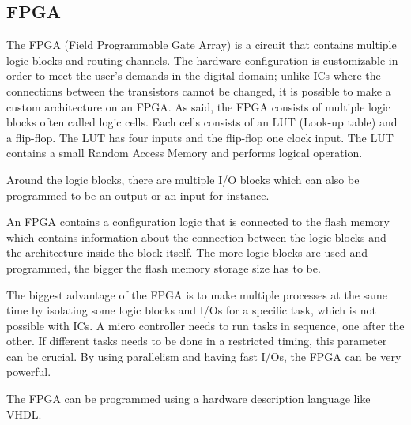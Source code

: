 \subsection{FPGA}


The FPGA (Field Programmable Gate Array) is a circuit that contains multiple logic blocks and routing channels.
The hardware configuration is customizable in order to meet the user’s demands in the digital domain; unlike ICs where the connections between the transistors cannot be changed, it is possible to make a custom architecture on an FPGA.
As said, the FPGA consists of multiple logic blocks often called logic cells. Each cells consists of an LUT (Look-up table) and a flip-flop. The LUT has four inputs and the flip-flop one clock input. The LUT contains a small Random Access Memory and performs logical operation.

Around the logic blocks, there are multiple I/O blocks which can also be programmed to be an output or an input for instance. 

An FPGA contains a configuration logic that is connected to the flash memory which contains information about the connection between the logic blocks and the architecture inside the block itself. The more logic blocks are used and programmed, the bigger the flash memory storage size has to be.

The biggest advantage of the FPGA is to make multiple processes at the same time by isolating some logic blocks and I/Os for a specific task, which is not possible with ICs. A micro controller needs to run tasks in sequence, one after the other. If different tasks needs to be done in a restricted timing, this parameter can be crucial. 
By using parallelism and having fast I/Os, the FPGA can be very powerful.

The FPGA can be programmed using a hardware description language like VHDL.








